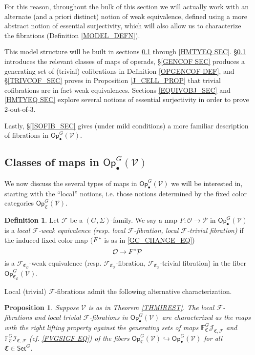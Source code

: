 \documentclass[a4paper,10pt
,draft
]{article}%
\numberwithin{equation}{section}
\numberwithin{figure}{section}
\newtheorem{proposition}[equation]{Proposition}%
\theoremstyle{definition} %
\newtheorem{definition}[equation]{Definition}%
\newcommand{\F}{\ensuremath{\mathcal F}}
\newcommand{\V}{\ensuremath{\mathcal V}}
\renewcommand{\O}{\ensuremath{\mathcal O}}
\renewcommand{\P}{\ensuremath{\mathcal P}}
\newcommand{\1}{\ensuremath{\mathbbm 1}}%
\begin{document}
For this reason, 
throughout the bulk of this section we will actually work with 
an alternate (and a priori distinct)
notion of weak equivalence,
defined using a more abstract notion of essential surjectivity,
which will also allow us to characterize the fibrations (Definition \ref{MODEL_DEFN}).


This model structure will be built in sections \ref{MAPSOPG_SEC} through \ref{HMTYEQ SEC}.
\S \ref{MAPSOPG_SEC} introduces the relevant classes of maps of operads,
\S \ref{GENCOF SEC} produces a generating set of (trivial) cofibrations in Definition \ref{OPGENCOF DEF},
and \S \ref{TRIVCOF_SEC} proves in Proposition \ref{J_CELL_PROP} that trivial cofibrations are in fact weak equivalences.
Sections \ref{EQUIVOBJ_SEC} and \ref{HMTYEQ SEC} explore several notions of essential surjectivity in order to prove 2-out-of-3.

Lastly, \S \ref{ISOFIB_SEC}
gives (under mild conditions) a more familiar description of fibrations in $\mathsf{Op}^G_\bullet(\V)$.





\subsection{Classes of maps in $\mathsf{Op}^G_\bullet(\mathcal V)$}
\label{MAPSOPG_SEC}


We now discuss the several types of maps in 
$\mathsf{Op}^G_\bullet(\V)$ we will be interested in,
starting with the ``local'' notions, 
i.e. those notions determined by the fixed color categories $\mathsf{Op}_{\mathfrak{C}}^G(\V)$.



\begin{definition}
Let $\F$ be a $(G, \Sigma)$-family.
%
We say a map $F: \O \to \P$ in $\mathsf{Op}^G_\bullet(\V)$
is a \emph{local $\F$-weak equivalence (resp. local $\F$-fibration, local $\F$-trivial fibration)}
if the induced fixed color map
($F^{\**}$ is as in \eqref{GC_CHANGE_EQ})
\[\O \to F^{\**} \P\]
is a $\F_{\mathfrak{C}_{\O}}$-weak equivalence (resp. $\F_{\mathfrak{C}_{\O}}$-fibration, $\F_{\mathfrak{C}_{\O}}$-trivial fibration) in the fiber $\mathsf{Op}^G_{\mathfrak{C}_{\O}}(\V)$.
\end{definition}


Local (trivial) $\F$-fibrations admit the following alternative characterization.



\begin{proposition}\label{LOCALTCHAR PROP}
Suppose $\V$ is as in Theorem \ref{THMIREST}.
The local $\F$-fibrations
and local trivial $\F$-fibrations
in $\mathsf{Op}^G_\bullet(\V)$
are characterized as the maps with the right lifting property against the generating sets of maps 
$\mathbb{F}^G_{\mathfrak{C}}\mathcal{J}_{\mathfrak{C},\mathcal{F}}$ and  $\mathbb{F}^G_{\mathfrak{C}}\mathcal{I}_{\mathfrak{C},\mathcal{F}}$
(cf. \eqref{FVGSIGF EQ})
of the fibers 
$\mathsf{Op}^G_{\mathfrak{C}}(\V) \hookrightarrow \mathsf{Op}^G_\bullet(\V)$
for all $\mathfrak{C} \in \mathsf{Set}^G$.
\end{proposition}
\end{document}
